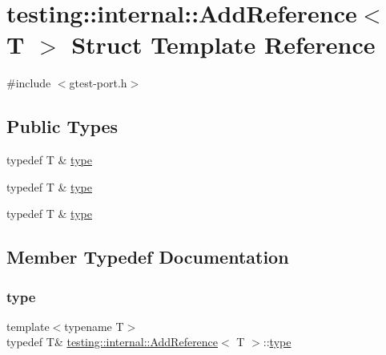 \hypertarget{structtesting_1_1internal_1_1_add_reference}{}\section{testing\+::internal\+::Add\+Reference$<$ T $>$ Struct Template Reference}
\label{structtesting_1_1internal_1_1_add_reference}


{\ttfamily \#include $<$gtest-\/port.\+h$>$}

\subsection*{Public Types}
\begin{DoxyCompactItemize}
\item 
typedef T \& \mbox{\hyperlink{structtesting_1_1internal_1_1_add_reference_a2df8dd7c4e41f6390e6e66b1a9a67bb4}{type}}
\item 
typedef T \& \mbox{\hyperlink{structtesting_1_1internal_1_1_add_reference_a2df8dd7c4e41f6390e6e66b1a9a67bb4}{type}}
\item 
typedef T \& \mbox{\hyperlink{structtesting_1_1internal_1_1_add_reference_a2df8dd7c4e41f6390e6e66b1a9a67bb4}{type}}
\end{DoxyCompactItemize}


\subsection{Member Typedef Documentation}
\mbox{\label{structtesting_1_1internal_1_1_add_reference_a2df8dd7c4e41f6390e6e66b1a9a67bb4}} 
\subsubsection{\texorpdfstring{type}{type}\hspace{0.1cm}{\footnotesize\ttfamily [1/3]}}
{\footnotesize\ttfamily template$<$typename T$>$ \\
typedef T\& \mbox{\hyperlink{structtesting_1_1internal_1_1_add_reference}{testing\+::internal\+::\+Add\+Reference}}$<$ T $>$\+::\mbox{\hyperlink{structtesting_1_1internal_1_1_add_reference_a2df8dd7c4e41f6390e6e66b1a9a67bb4}{type}}}

